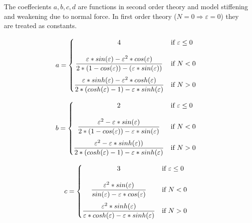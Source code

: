 The coeffecients $a, b, c ,d$ are functions in second order theory and model stiffening and weakening due to normal force.
In first order theory ($N = 0 \Rightarrow \varepsilon = 0$) they are treated as constants.

\begin{equation} \label{a}
    a = \begin{cases}
            \hfil 4              & \text{if } \varepsilon \leq 0\\[1.2em]
            \hfil \dfrac{\varepsilon * sin(\varepsilon) - \varepsilon^2 * cos(\varepsilon)}{2 * (1 - cos(\varepsilon)) - (\varepsilon * sin(\varepsilon))}               & \text{if } N < 0          \\[1.2em]
            \dfrac{\varepsilon * sinh(\varepsilon) - \varepsilon^2 * cosh(\varepsilon)}{2 * (cosh(\varepsilon) - 1) - \varepsilon * sinh(\varepsilon)}               & \text{if } N > 0
        \end{cases}
\end{equation}

\begin{equation} \label{b}
    b = \begin{cases}
            \hfil 2              & \text{if } \varepsilon \leq 0\\[1.2em]
            \hfil \dfrac{\varepsilon^2 - \varepsilon * sin(\varepsilon)}{2*(1 - cos(\varepsilon)) - \varepsilon * sin(\varepsilon) }               & \text{if } N < 0          \\[1.2em]
            \dfrac{\varepsilon^2 - \varepsilon * sinh(\varepsilon))}{2 * (cosh(\varepsilon) - 1) - \varepsilon * sinh(\varepsilon)}               & \text{if } N > 0
        \end{cases}
\end{equation}

\begin{equation} \label{c}
    c = \begin{cases}
            \hfil 3              & \text{if } \varepsilon \leq 0\\[1.2em]
            \hfil \dfrac{\varepsilon^2 * sin(\varepsilon)}{sin(\varepsilon) - \varepsilon * cos(\varepsilon)}               & \text{if } N < 0          \\[1.2em]
            \dfrac{\varepsilon^2 * sinh(\varepsilon)}{\varepsilon * cosh(\varepsilon) - \varepsilon * sinh(\varepsilon)}               & \text{if } N > 0
        \end{cases}
\end{equation}

